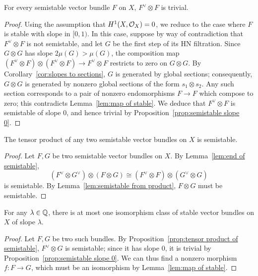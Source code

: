 \begin{lemma} \label{lem:end of semistable}
For every semistable vector bundle $F$ on $X$, $F^\vee \otimes F$ is trivial.
\end{lemma}
\begin{proof}
Using the assumption that $H^1(X, \mathcal{O}_X) = 0$,
we reduce to the case where $F$ is stable with slope in $[0,1)$. In this case, suppose by way of contradiction that $F^\vee \otimes F$ is not semistable, and let $G$ be the first step of its HN filtration. Since $G \otimes G$ has slope $2\mu(G) > \mu(G)$, 
the composition map $(F^\vee \otimes F) \otimes (F^\vee \otimes F) \to F^\vee \otimes F$
restricts to zero on $G \otimes G$.
By Corollary~\ref{cor:slopes to sections}, $G$ is generated by global sections;
consequently, $G \otimes G$ is generated by nonzero global sections of the form $s_1 \otimes s_2$.
Any such section corresponds to a pair of nonzero endomorphisms $F \to F$ which compose to zero; this contradicts Lemma~\ref{lem:map of stable}.
We deduce that $F^\vee \otimes F$ is semistable of slope $0$,
and hence trivial by Proposition~\ref{prop:semistable slope 0}.
\end{proof}

\begin{proposition} \label{prop:tensor product of semistable}
The tensor product of any two semistable vector bundles on $X$ is semistable.
\end{proposition}
\begin{proof}
Let $F,G$ be two semistable vector bundles on $X$.
By Lemma~\ref{lem:end of semistable}, 
\[
(F^\vee \otimes G^\vee) \otimes (F \otimes G)
\cong (F^\vee \otimes F) \otimes (G^\vee \otimes G)
\]
is semistable. By Lemma~\ref{lem:semistable from product}, $F \otimes G$ must be semistable.
\end{proof}

\begin{lemma} \label{cor:unique stable}
For any $\lambda \in \mathbb{Q}$, there is at most one isomorphism class of stable vector bundles on $X$ of slope $\lambda$.
\end{lemma}
\begin{proof}
Let $F,G$ be two such bundles. By Proposition~\ref{prop:tensor product of semistable}, $F^\vee \otimes G$ is semistable; since it has slope 0, it is trivial by Proposition~\ref{prop:semistable slope 0}.
We can thus find a nonzero morphism $f\colon 
F \to G$, which must be an isomorphism by Lemma~\ref{lem:map of stable}.
\end{proof}

